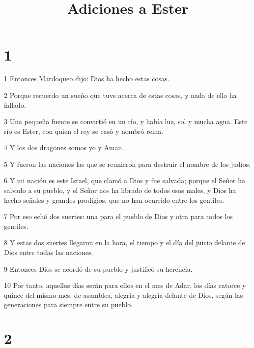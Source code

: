 

\title{Adiciones a Ester}

\chapter{1}

\par 1 Entonces Mardoqueo dijo: Dios ha hecho estas cosas.
\par 2 Porque recuerdo un sueño que tuve acerca de estas cosas, y nada de ello ha fallado.
\par 3 Una pequeña fuente se convirtió en un río, y había luz, sol y mucha agua. Este río es Ester, con quien el rey se casó y nombró reina.
\par 4 Y los dos dragones somos yo y Aman.
\par 5 Y fueron las naciones las que se reunieron para destruir el nombre de los judíos.
\par 6 Y mi nación es este Israel, que clamó a Dios y fue salvada; porque el Señor ha salvado a su pueblo, y el Señor nos ha librado de todos esos males, y Dios ha hecho señales y grandes prodigios, que no han ocurrido entre los gentiles.
\par 7 Por eso echó dos suertes: una para el pueblo de Dios y otra para todos los gentiles.
\par 8 Y estas dos suertes llegaron en la hora, el tiempo y el día del juicio delante de Dios entre todas las naciones.
\par 9 Entonces Dios se acordó de su pueblo y justificó su herencia.
\par 10 Por tanto, aquellos días serán para ellos en el mes de Adar, los días catorce y quince del mismo mes, de asamblea, alegría y alegría delante de Dios, según las generaciones para siempre entre su pueblo.

\chapter{2}

